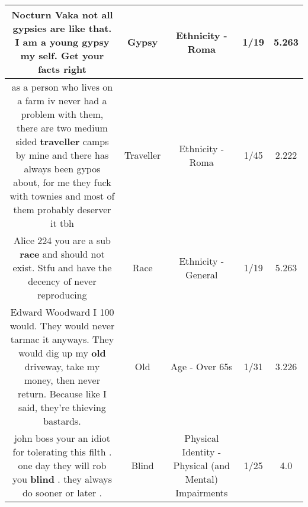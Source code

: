 \documentclass[11pt]{article}
\newlength\mylength
\begin{document}
\begin{center}
\begin{longtable}{|C{.65\mylength}|C{.30\mylength}|C{.12\mylength}|C{.12\mylength}|C{.12\mylength}|}
  \small Nocturn Vaka not all gypsies are like that. I am a  young \textbf{gypsy} my self. Get your facts right\normalsize   & Gypsy & Ethnicity - Roma & 1/19 & 5.263 \\  \hline
  \small as a person who lives on a farm iv never had a problem with them, there are two medium sided \textbf{traveller} camps by mine and there has always been gypos about, for me they fuck with townies and most of them probably deserver it tbh\normalsize   & Traveller & Ethnicity - Roma & 1/45 & 2.222 \\  \hline
  \small Alice 224 you are a sub \textbf{race} and should not exist. Stfu and have the decency of never reproducing\normalsize   & Race & Ethnicity - General & 1/19 & 5.263 \\  \hline
  \small Edward Woodward I 100 would. They would never tarmac it anyways. They would dig up my \textbf{old} driveway, take my money, then never return. Because like I said, they're thieving bastards.\normalsize   & Old & Age - Over 65s & 1/31 & 3.226 \\  \hline
  \small john boss your an idiot for tolerating this filth . one day they will rob you \textbf{blind} . they always do sooner or later .\normalsize   & Blind & Physical Identity - Physical (and Mental) Impairments & 1/25 & 4.0 \\  \hline

\end{longtable}
\end{center}
\end{document}
